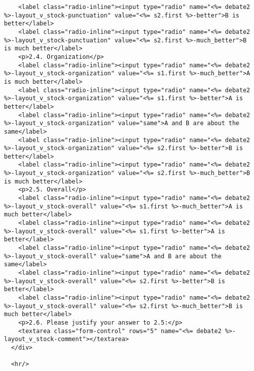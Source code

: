 \documentclass{article}
\begin{document}
\begin{verbatim}
    <label class="radio-inline"><input type="radio" name="<%= debate2 %>-layout_v_stock-punctuation" value="<%= s2.first %>-better">B is better</label>
    <label class="radio-inline"><input type="radio" name="<%= debate2 %>-layout_v_stock-punctuation" value="<%= s2.first %>-much_better">B is much better</label>
    <p>2.4. Organization</p>
    <label class="radio-inline"><input type="radio" name="<%= debate2 %>-layout_v_stock-organization" value="<%= s1.first %>-much_better">A is much better</label>
    <label class="radio-inline"><input type="radio" name="<%= debate2 %>-layout_v_stock-organization" value="<%= s1.first %>-better">A is better</label>
    <label class="radio-inline"><input type="radio" name="<%= debate2 %>-layout_v_stock-organization" value="same">A and B are about the same</label>
    <label class="radio-inline"><input type="radio" name="<%= debate2 %>-layout_v_stock-organization" value="<%= s2.first %>-better">B is better</label>
    <label class="radio-inline"><input type="radio" name="<%= debate2 %>-layout_v_stock-organization" value="<%= s2.first %>-much_better">B is much better</label>
    <p>2.5. Overall</p>
    <label class="radio-inline"><input type="radio" name="<%= debate2 %>-layout_v_stock-overall" value="<%= s1.first %>-much_better">A is much better</label>
    <label class="radio-inline"><input type="radio" name="<%= debate2 %>-layout_v_stock-overall" value="<%= s1.first %>-better">A is better</label>
    <label class="radio-inline"><input type="radio" name="<%= debate2 %>-layout_v_stock-overall" value="same">A and B are about the same</label>
    <label class="radio-inline"><input type="radio" name="<%= debate2 %>-layout_v_stock-overall" value="<%= s2.first %>-better">B is better</label>
    <label class="radio-inline"><input type="radio" name="<%= debate2 %>-layout_v_stock-overall" value="<%= s2.first %>-much_better">B is much better</label>
    <p>2.6. Please justify your answer to 2.5:</p>
    <textarea class="form-control" rows="5" name="<%= debate2 %>-layout_v_stock-comment"></textarea>
  </div>

  <hr/>


\end{verbatim}
\end{document}
